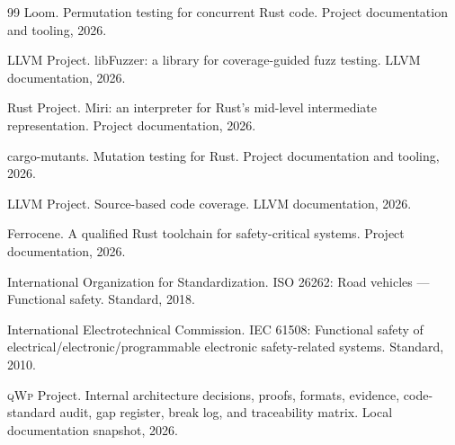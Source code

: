 \documentclass[11pt,a4paper]{article}
\theoremstyle{remark}
\newcommand{\qwp}{\textsc{qWp}}
\begin{document}
\begin{thebibliography}{99}
Loom.
\newblock Permutation testing for concurrent Rust code.
\newblock Project documentation and tooling, 2026.

LLVM Project.
\newblock libFuzzer: a library for coverage-guided fuzz testing.
\newblock LLVM documentation, 2026.

Rust Project.
\newblock Miri: an interpreter for Rust's mid-level intermediate representation.
\newblock Project documentation, 2026.

cargo-mutants.
\newblock Mutation testing for Rust.
\newblock Project documentation and tooling, 2026.

LLVM Project.
\newblock Source-based code coverage.
\newblock LLVM documentation, 2026.

Ferrocene.
\newblock A qualified Rust toolchain for safety-critical systems.
\newblock Project documentation, 2026.

International Organization for Standardization.
\newblock ISO 26262: Road vehicles --- Functional safety.
\newblock Standard, 2018.

International Electrotechnical Commission.
\newblock IEC 61508: Functional safety of electrical/electronic/programmable electronic safety-related systems.
\newblock Standard, 2010.

\qwp{} Project.
\newblock Internal architecture decisions, proofs, formats, evidence, code-standard audit, gap register, break log, and traceability matrix.
\newblock Local documentation snapshot, 2026.

\end{thebibliography}
\end{document}
